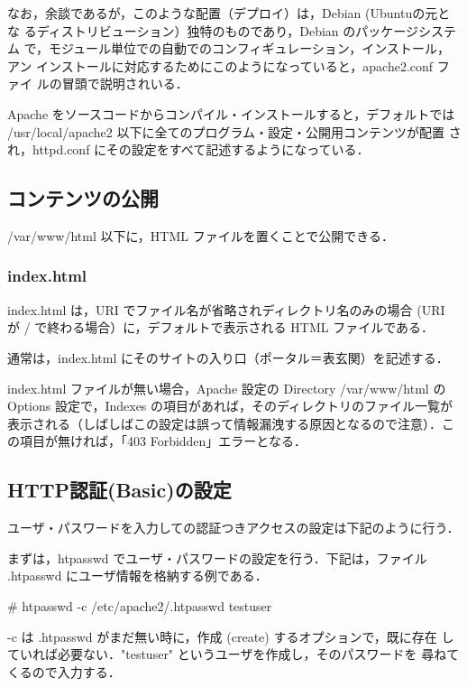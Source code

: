 なお，余談であるが，このような配置（デプロイ）は，Debian (Ubuntuの元とな
るディストリビューション）独特のものであり，Debian のパッケージシステム
で，モジュール単位での自動でのコンフィギュレーション，インストール，アン
インストールに対応するためにこのようになっていると，apache2.conf ファイ
ルの冒頭で説明されいる．

Apache をソースコードからコンパイル・インストールすると，デフォルトでは
/usr/local/apache2 以下に全てのプログラム・設定・公開用コンテンツが配置
され，httpd.conf にその設定をすべて記述するようになっている．

\subsection{コンテンツの公開}

/var/www/html 以下に，HTML ファイルを置くことで公開できる．

\subsubsection*{index.html}

index.html は，URI でファイル名が省略されディレクトリ名のみの場合 (URI
が / で終わる場合）に，デフォルトで表示される HTML ファイルである．

通常は，index.html にそのサイトの入り口（ポータル＝表玄関）を記述する．

index.html ファイルが無い場合，Apache 設定の Directory /var/www/html の 
Options 設定で，Indexes の項目があれば，そのディレクトリのファイル一覧が
表示される（しばしばこの設定は誤って情報漏洩する原因となるので注意）．こ
の項目が無ければ，「403 Forbidden」エラーとなる．

\subsection{HTTP認証(Basic)の設定}

ユーザ・パスワードを入力しての認証つきアクセスの設定は下記のように行う．

まずは，htpasswd でユーザ・パスワードの設定を行う．下記は，ファイル 
.htpasswd にユーザ情報を格納する例である．

\begin{cli}
# htpasswd -c /etc/apache2/.htpasswd testuser
\end{cli}

-c は .htpasswd がまだ無い時に，作成 (create) するオプションで，既に存在
   していれば必要ない．"testuser" というユーザを作成し，そのパスワードを
   尋ねてくるので入力する．

